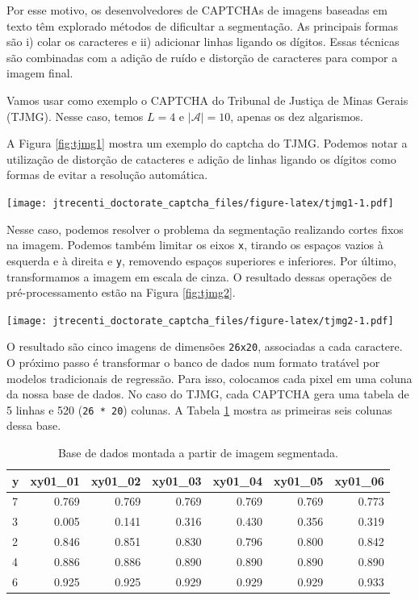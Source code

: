\documentclass[12pt,]{report}
\let\origfigure\figure
\let\endorigfigure\endfigure
\renewenvironment{figure}[1][2] {
    \expandafter\origfigure\expandafter[H]
} {
    \endorigfigure
}
\begin{document}
Por esse motivo, os desenvolvedores de CAPTCHAs de imagens baseadas em
texto têm explorado métodos de dificultar a segmentação. As principais
formas são i) colar os caracteres e ii) adicionar linhas ligando os
dígitos. Essas técnicas são combinadas com a adição de ruído e distorção
de caracteres para compor a imagem final.

Vamos usar como exemplo o CAPTCHA do Tribunal de Justiça de Minas Gerais
(TJMG). Nesse caso, temos \(L=4\) e \(|\mathcal A|=10\), apenas os dez
algarismos.

A Figura \ref{fig:tjmg1} mostra um exemplo do captcha do TJMG. Podemos
notar a utilização de distorção de catacteres e adição de linhas ligando
os dígitos como formas de evitar a resolução automática.

\begin{figure}
\centering
\texttt{[image: jtrecenti\_doctorate\_captcha\_files/figure-latex/tjmg1-1.pdf]}
\caption{\label{fig:tjmg1}CAPTCHA do TJMG.}
\end{figure}

Nesse caso, podemos resolver o problema da segmentação realizando cortes
fixos na imagem. Podemos também limitar os eixos \texttt{x}, tirando os
espaços vazios à esquerda e à direita e \texttt{y}, removendo espaços
superiores e inferiores. Por último, transformamos a imagem em escala de
cinza. O resultado dessas operações de pré-processamento estão na Figura
\ref{fig:tjmg2}.

\begin{figure}
\centering
\texttt{[image: jtrecenti\_doctorate\_captcha\_files/figure-latex/tjmg2-1.pdf]}
\caption{\label{fig:tjmg2}CAPTCHA do TJMG após segmentação.}
\end{figure}

O resultado são cinco imagens de dimensões \texttt{26x20}, associadas a
cada caractere. O próximo passo é transformar o banco de dados num
formato tratável por modelos tradicionais de regressão. Para isso,
colocamos cada pixel em uma coluna da nossa base de dados. No caso do
TJMG, cada CAPTCHA gera uma tabela de 5 linhas e 520
(\texttt{26\ *\ 20}) colunas. A Tabela \ref{tab:imgsep} mostra as
primeiras seis colunas dessa base.

\begin{table}

\caption{\label{tab:imgsep}Base de dados montada a partir de imagem segmentada.}
\centering
\begin{tabular}[t]{l|r|r|r|r|r|r}
\hline
y & xy01\_01 & xy01\_02 & xy01\_03 & xy01\_04 & xy01\_05 & xy01\_06\\
\hline
7 & 0.769 & 0.769 & 0.769 & 0.769 & 0.769 & 0.773\\
\hline
3 & 0.005 & 0.141 & 0.316 & 0.430 & 0.356 & 0.319\\
\hline
2 & 0.846 & 0.851 & 0.830 & 0.796 & 0.800 & 0.842\\
\hline
4 & 0.886 & 0.886 & 0.890 & 0.890 & 0.890 & 0.890\\
\hline
6 & 0.925 & 0.925 & 0.929 & 0.929 & 0.929 & 0.933\\
\hline
\end{tabular}
\end{table}
\end{document}
